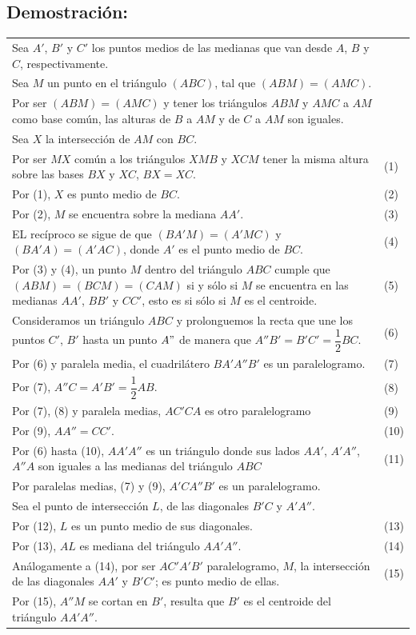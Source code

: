 \documentclass[12pt,a4paper]{article}
\begin{document}
\subsection*{Demostración:}
\begin{tabular}{p{15.9 cm} p{1cm}}
Sea $A'$, $B'$ y $C'$ los puntos medios de las medianas que van desde $A$, $B$ y $C$, respectivamente. 
\\Sea $M$ un punto en el triángulo $(ABC)$, tal que $(ABM)=(AMC).$
\\Por ser $(ABM)=(AMC)$ y tener los triángulos $ABM$ y $AMC$ a $AM$ como base común, las alturas de $B$ a $AM$ y de $C$ a $AM$ son iguales. 
\\Sea $X$ la intersección de $AM$ con $BC$.
\\Por ser $MX$ común a los triángulos $XMB$ y $XCM$ tener la misma altura sobre las bases $BX$ y $XC$, $BX=XC$. &(1)
\\Por (1), $X$ es punto medio de $BC$. &(2)
\\Por (2), $M$ se encuentra sobre la mediana $AA'$. &(3)
\\EL recíproco se sigue de que $(BA'M)=(A'MC)$ y $(BA'A)=(A'AC)$, donde $A'$ es el punto medio de $BC$.&(4)
\\Por (3) y (4), un punto $M$ dentro del triángulo $ABC$ cumple que $(ABM)=(BCM)=(CAM)$ si y sólo si $M$ se encuentra en las medianas $AA'$, $BB'$ y $CC'$, esto es si sólo si $M$ es el centroide. &\medskip \medskip(5)
\\Consideramos un triángulo $ABC$ y prolonguemos la recta que une los puntos $C'$, $B'$ hasta un punto $A"$ de manera que $A''B'=B'C'=\dfrac{1}{2}BC$.& \medskip (6)
\\Por (6) y paralela media, el cuadrilátero $BA'A''B'$ es un paralelogramo. &(7)
\\Por (7), $A''C=A'B'=\dfrac{1}{2}AB$. &(8)
\\Por (7), (8) y paralela medias, $AC'CA$ es otro paralelogramo &(9)
\\Por (9), $AA''= CC'$. &(10)
\\Por (6) hasta (10), $AA'A''$ es un triángulo donde sus lados $AA'$, $A'A''$, $A''A$ son iguales a las medianas del triángulo $ABC$ &(11)
\\Por paralelas medias, (7) y (9), $A'CA''B'$ es un paralelogramo.
\\Sea el punto de intersección $L$, de las diagonales $B'C$ y $A'A''$.
\\Por (12), $L$ es un punto medio de sus diagonales. &(13)
\\Por (13), $AL$ es mediana del triángulo $AA'A''$. &(14)
\\Análogamente a (14), por ser $AC'A'B'$ paralelogramo, $M$, la intersección de las diagonales $AA'$ y $B'C'$; es punto medio de ellas. &\medskip (15)
\\Por (15), $A''M$ se cortan en $B'$, resulta que $B'$ es el centroide del triángulo $AA'A''$.
\end{tabular} 
\end{document}
